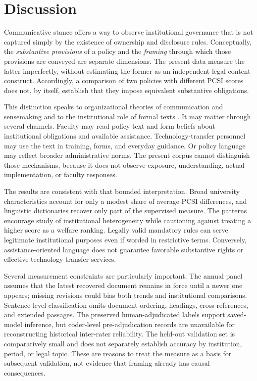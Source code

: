 \documentclass[11pt]{article}
\begin{document}
\section{Discussion}
Communicative stance offers a way to observe institutional governance that is not captured simply by the existence of ownership and disclosure rules. Conceptually, the \emph{substantive provisions} of a policy and the \emph{framing} through which those provisions are conveyed are separate dimensions. The present data measure the latter imperfectly, without estimating the former as an independent legal-content construct. Accordingly, a comparison of two policies with different PCSI scores does not, by itself, establish that they impose equivalent substantive obligations.

This distinction speaks to organizational theories of communication and sensemaking \citep{putnam2009,maitlis2014,fairhurst2004} and to the institutional role of formal texts \citep{smith2001,phillips2004}. It may matter through several channels. Faculty may read policy text and form beliefs about institutional obligations and available assistance. Technology-transfer personnel may use the text in training, forms, and everyday guidance. Or policy language may reflect broader administrative norms. The present corpus cannot distinguish those mechanisms, because it does not observe exposure, understanding, actual implementation, or faculty responses.

The results are consistent with that bounded interpretation. Broad university characteristics account for only a modest share of average PCSI differences, and linguistic dictionaries recover only part of the supervised measure. The patterns encourage study of institutional heterogeneity while cautioning against treating a higher score as a welfare ranking. Legally valid mandatory rules can serve legitimate institutional purposes even if worded in restrictive terms. Conversely, assistance-oriented language does not guarantee favorable substantive rights or effective technology-transfer services.

Several measurement constraints are particularly important. The annual panel assumes that the latest recovered document remains in force until a newer one appears; missing revisions could bias both trends and institutional comparisons. Sentence-level classification omits document ordering, headings, cross-references, and extended passages. The preserved human-adjudicated labels support saved-model inference, but coder-level pre-adjudication records are unavailable for reconstructing historical inter-rater reliability. The held-out validation set is comparatively small and does not separately establish accuracy by institution, period, or legal topic. These are reasons to treat the measure as a basis for subsequent validation, not evidence that framing already has causal consequences.
\end{document}
